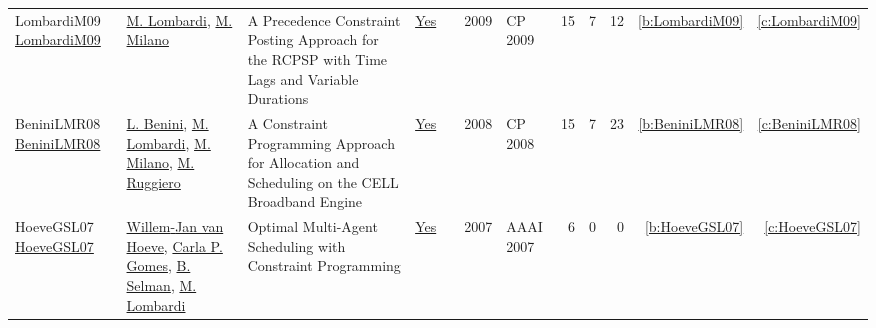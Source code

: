 {\begin{longtable}{>{\raggedright\arraybackslash}p{3cm}>{\raggedright\arraybackslash}p{6cm}>{\raggedright\arraybackslash}p{6.5cm}rrrp{2.5cm}rrrrr}
LombardiM09 \href{https://doi.org/10.1007/978-3-642-04244-7\_45}{LombardiM09} & \hyperref[auth:a143]{M. Lombardi}, \hyperref[auth:a144]{M. Milano} & A Precedence Constraint Posting Approach for the {RCPSP} with Time Lags and Variable Durations & \href{../works/LombardiM09.pdf}{Yes} & \cite{LombardiM09} & 2009 & CP 2009 & 15 & 7 & 12 & \ref{b:LombardiM09} & \ref{c:LombardiM09}\\
BeniniLMR08 \href{http://dx.doi.org/10.1007/978-3-540-85958-1_2}{BeniniLMR08} & \hyperref[auth:a248]{L. Benini}, \hyperref[auth:a143]{M. Lombardi}, \hyperref[auth:a144]{M. Milano}, \hyperref[auth:a727]{M. Ruggiero} & A Constraint Programming Approach for Allocation and Scheduling on the CELL Broadband Engine & \href{../works/BeniniLMR08.pdf}{Yes} & \cite{BeniniLMR08} & 2008 & CP 2008 & 15 & 7 & 23 & \ref{b:BeniniLMR08} & \ref{c:BeniniLMR08}\\
HoeveGSL07 \href{http://www.aaai.org/Library/AAAI/2007/aaai07-291.php}{HoeveGSL07} & \hyperref[auth:a212]{Willem{-}Jan van Hoeve}, \hyperref[auth:a652]{Carla P. Gomes}, \hyperref[auth:a653]{B. Selman}, \hyperref[auth:a143]{M. Lombardi} & Optimal Multi-Agent Scheduling with Constraint Programming & \href{../works/HoeveGSL07.pdf}{Yes} & \cite{HoeveGSL07} & 2007 & AAAI 2007 & 6 & 0 & 0 & \ref{b:HoeveGSL07} & \ref{c:HoeveGSL07}\\
\end{longtable}
}

\clearpage
